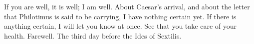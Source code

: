 

If you are well, it is well; I am well. About Caesar's arrival, and about the letter that Philotimus is said to be carrying, I have nothing certain yet. If there is anything certain, I will let you know at once. See that you take care of your health. Farewell. The third day before the Ides of Sextilis.
